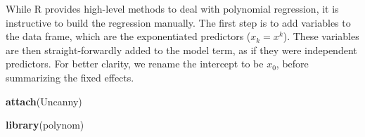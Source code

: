 \documentclass[]{svmono}
\newenvironment{Shaded}{\begin{snugshade}}{\end{snugshade}}
\newcommand{\KeywordTok}[1]{\textcolor[rgb]{0.13,0.29,0.53}{\textbf{#1}}}
\newcommand{\DataTypeTok}[1]{\textcolor[rgb]{0.13,0.29,0.53}{#1}}
\newcommand{\DecValTok}[1]{\textcolor[rgb]{0.00,0.00,0.81}{#1}}
\newcommand{\StringTok}[1]{\textcolor[rgb]{0.31,0.60,0.02}{#1}}
\newcommand{\CommentTok}[1]{\textcolor[rgb]{0.56,0.35,0.01}{\textit{#1}}}
\newcommand{\OperatorTok}[1]{\textcolor[rgb]{0.81,0.36,0.00}{\textbf{#1}}}
\newcommand{\NormalTok}[1]{#1}
\begin{document}
While R provides high-level methods to deal with polynomial regression,
it is instructive to build the regression manually. The first step is to
add variables to the data frame, which are the exponentiated predictors
(\(x_k = x^k\)). These variables are then straight-forwardly added to
the model term, as if they were independent predictors. For better
clarity, we rename the intercept to be \(x_0\), before summarizing the
fixed effects.

\begin{Shaded}
\begin{Highlighting}[]
\KeywordTok{attach}\NormalTok{(Uncanny)}
\end{Highlighting}
\end{Shaded}

\begin{Shaded}
\end{Shaded}

\begin{Shaded}
\end{Shaded}

\begin{Shaded}
\begin{Highlighting}[]
\KeywordTok{library}\NormalTok{(polynom)}
\end{Highlighting}
\end{Shaded}
\end{document}
